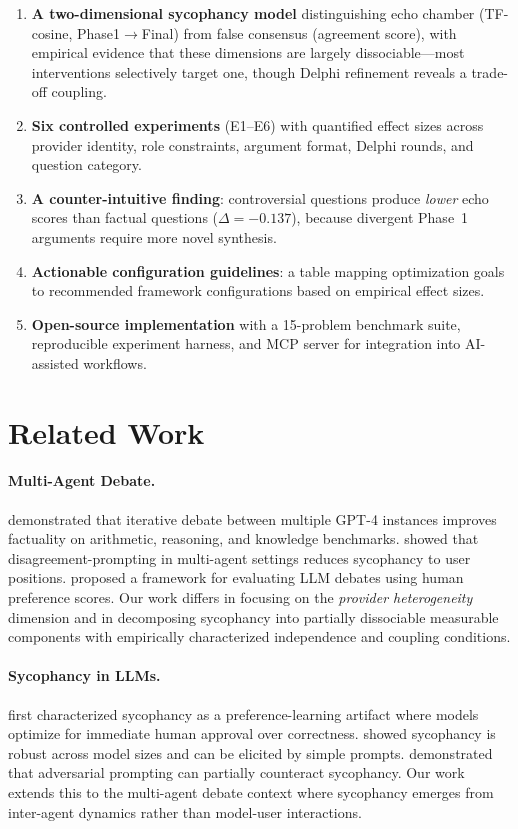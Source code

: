 \documentclass[11pt]{article}
\begin{document}
\begin{enumerate}
    \item \textbf{A two-dimensional sycophancy model} distinguishing echo chamber (TF-cosine, Phase1$\to$Final) from false consensus (agreement score), with empirical evidence that these dimensions are largely dissociable---most interventions selectively target one, though Delphi refinement reveals a trade-off coupling.
    \item \textbf{Six controlled experiments} (E1--E6) with quantified effect sizes across provider identity, role constraints, argument format, Delphi rounds, and question category.
    \item \textbf{A counter-intuitive finding}: controversial questions produce \textit{lower} echo scores than factual questions ($\Delta = -0.137$), because divergent Phase~1 arguments require more novel synthesis.
    \item \textbf{Actionable configuration guidelines}: a table mapping optimization goals to recommended framework configurations based on empirical effect sizes.
    \item \textbf{Open-source implementation} with a 15-problem benchmark suite, reproducible experiment harness, and MCP server for integration into AI-assisted workflows.
\end{enumerate}

\section{Related Work}
\label{sec:related}

\paragraph{Multi-Agent Debate.}
\citet{du2023improving} demonstrated that iterative debate between multiple GPT-4 instances improves factuality on arithmetic, reasoning, and knowledge benchmarks. \citet{liang2023encouraging} showed that disagreement-prompting in multi-agent settings reduces sycophancy to user positions. \citet{chan2023chateval} proposed a framework for evaluating LLM debates using human preference scores. Our work differs in focusing on the \textit{provider heterogeneity} dimension and in decomposing sycophancy into partially dissociable measurable components with empirically characterized independence and coupling conditions.

\paragraph{Sycophancy in LLMs.}
\citet{perez2022discovering} first characterized sycophancy as a preference-learning artifact where models optimize for immediate human approval over correctness. \citet{sharma2023towards} showed sycophancy is robust across model sizes and can be elicited by simple prompts. \citet{wei2023simple} demonstrated that adversarial prompting can partially counteract sycophancy. Our work extends this to the multi-agent debate context where sycophancy emerges from inter-agent dynamics rather than model-user interactions.
\end{document}

